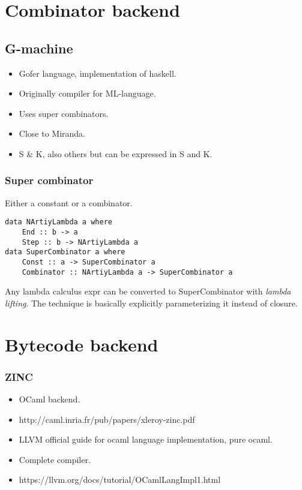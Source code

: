 \documentclass[11pt]{article}
\begin{document}
\section{Combinator backend}
\subsection{G-machine}
\begin{itemize}
    \item Gofer language, implementation of haskell.
    \item Originally compiler for ML-language.
    \item Uses super combinators.
    \item Close to Miranda.
    \item S \& K, also others but can be expressed in S and K.
\end{itemize}
\subsubsection{Super combinator}
Either a constant or a combinator.
\begin{verbatim}
data NArtiyLambda a where
    End :: b -> a
    Step :: b -> NArtiyLambda a
data SuperCombinator a where
    Const :: a -> SuperCombinator a
    Combinator :: NArtiyLambda a -> SuperCombinator a
\end{verbatim}
Any lambda calculus expr can be converted to SuperCombinator with \textit{lambda lifting}.
The technique is basically explicitly parameterizing it instead of closure.

\section{Bytecode backend}
\subsubsection{ZINC}
\begin{itemize}
    \item OCaml backend.
    \item http://caml.inria.fr/pub/papers/xleroy-zinc.pdf
\end{itemize}
\begin{itemize}
    \item LLVM official guide for ocaml language implementation, pure ocaml.
    \item Complete compiler.
    \item https://llvm.org/docs/tutorial/OCamlLangImpl1.html
\end{itemize}
\end{document}
